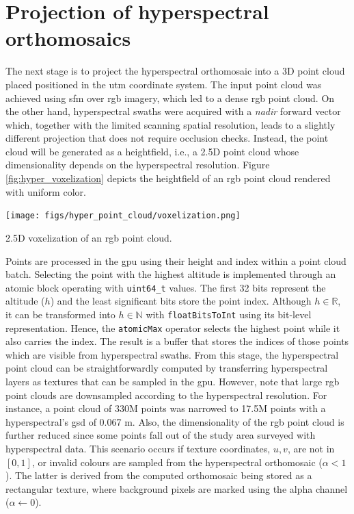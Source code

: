 \section{Projection of hyperspectral orthomosaics}

The next stage is to project the hyperspectral orthomosaic into a 3D point cloud placed positioned in the \acrshort{utm} coordinate system. The input point cloud was achieved using \acrshort{sfm} over \acrshort{rgb} imagery, which led to a dense \acrshort{rgb} point cloud. On the other hand, hyperspectral swaths were acquired with a \textit{nadir} forward vector which, together with the limited scanning spatial resolution, leads to a slightly different projection that does not require occlusion checks. Instead, the point cloud will be generated as a heightfield, i.e., a 2.5D point cloud whose dimensionality depends on the hyperspectral resolution. Figure \ref{fig:hyper_voxelization} depicts the heightfield of an \acrshort{rgb} point cloud rendered with uniform color.

\begin{marginfigure}[.1cm]
    \centering
    \texttt{[image: figs/hyper\_point\_cloud/voxelization.png]}
	\caption{2.5D voxelization of an \acrshort{rgb} point cloud. }
	\label{fig:hyper_voxelization}
\end{marginfigure}
Points are processed in the \acrshort{gpu} using their height and index within a point cloud batch. Selecting the point with the highest altitude is implemented through an atomic block operating with \verb|uint64_t| values. The first 32 bits represent the altitude ($h$) and the least significant bits store the point index. Although $h \in \mathbb{R}$, it can be transformed into $h \in \mathbb{N}$ with \verb|floatBitsToInt| using its bit-level representation. Hence, the \verb|atomicMax| operator selects the highest point while it also carries the index. The result is a buffer that stores the indices of those points which are visible from hyperspectral swaths. From this stage, the hyperspectral point cloud can be straightforwardly computed by transferring hyperspectral layers as textures that can be sampled in the \acrshort{gpu}. However, note that large \acrshort{rgb} point clouds are downsampled according to the hyperspectral resolution. For instance, a point cloud of 330M points was narrowed to 17.5M points with a hyperspectral's \acrshort{gsd} of 0.067 \si{\meter}. Also, the dimensionality of the \acrshort{rgb} point cloud is further reduced since some points fall out of the study area surveyed with hyperspectral data. This scenario occurs if texture coordinates, $u, v$, are not in $\left[0, 1\right]$, or invalid colours are sampled from the hyperspectral orthomosaic ($\alpha < 1$). The latter is derived from the computed orthomosaic being stored as a rectangular texture, where background pixels are marked using the alpha channel ($\alpha \gets 0$). 

